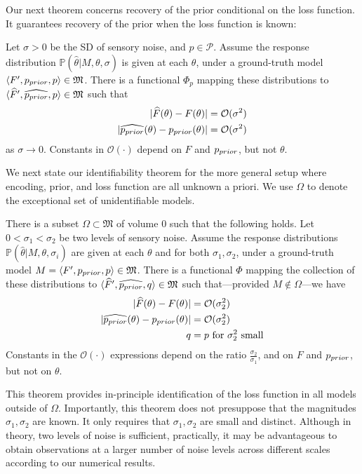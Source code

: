 Our next theorem concerns recovery of the prior conditional on the loss function. It guarantees recovery of the prior when the loss function is known: %
\begin{thm*} %
Let $\sigma > 0$ be the SD of sensory noise, and $p \in \mathcal{P}$.
Assume the %
response distribution $\mathbb{P}(\widehat{\theta}|M,\theta, \sigma)$ is given at each $\theta$, under a ground-truth model $\langle F', p_{prior},p \rangle \in \mathfrak{M}$. 
There is a functional $\Phi_p$ mapping these distributions to $\langle \widehat{F}', \widehat{p_{prior}},p \rangle \in \mathfrak{M}$ such that 
\begin{align*}
|\widehat{F}(\theta) - F(\theta)| &= \mathcal{O}(\sigma^2) \\
|\widehat{p_{prior}}(\theta) - p_{prior}(\theta) | &= \mathcal{O}(\sigma^2) 
\end{align*}
as $\sigma \rightarrow 0$.
Constants in $\mathcal{O}(\cdot)$ depend on $F$ and $p_{prior}$, but not  $\theta$. 
\end{thm*}
We next state our identifiability theorem for the more general setup where encoding, prior, and loss function are all unknown a priori.
We use $\Omega$ to denote the exceptional set of unidentifiable models.
\begin{thm*} %
There is a subset $\Omega \subset \mathfrak{M}$ of volume $0$ such that the following holds.
Let $0 < \sigma_1 < \sigma_2$ be two levels of sensory noise. %
Assume the %
response distributions $\mathbb{P}(\widehat{\theta}|M,\theta, \sigma_i)$ are given at each $\theta$ and for both $\sigma_1, \sigma_2$, under a ground-truth model $M = \langle F', p_{prior},p \rangle \in \mathfrak{M}$.
There is a functional $\Phi$ mapping the collection of these distributions to $\langle \widehat{F}', \widehat{p_{prior}},q \rangle \in \mathfrak{M}$
such that---provided $M \not\in \Omega$---we have
\begin{align*}
    |\widehat{F}(\theta) - F(\theta)| &= \mathcal{O}(\sigma_2^2) \\
    |\widehat{p_{prior}}(\theta) - p_{prior}(\theta)| &= \mathcal{O}(\sigma_2^2) \\
    q &= p  \text{ for $\sigma_2^2$ small}
\end{align*}
%
Constants in the $\mathcal{O}(\cdot)$ expressions depend on the ratio $\frac{\sigma_2}{\sigma_1}$, and on $F$ and $p_{prior}$, but not on $\theta$.

%
\end{thm*}
%
This theorem provides in-principle identification of the loss function in all models outside of $\Omega$. %
Importantly, this theorem does not presuppose that the magnitudes $\sigma_1, \sigma_2$ are known. It only requires that $\sigma_1, \sigma_2$ are small and distinct.
Although in theory, two levels of noise is sufficient, practically, it may be advantageous to obtain observations at a larger number of noise levels across different scales according to our numerical results. 
%
%
%




